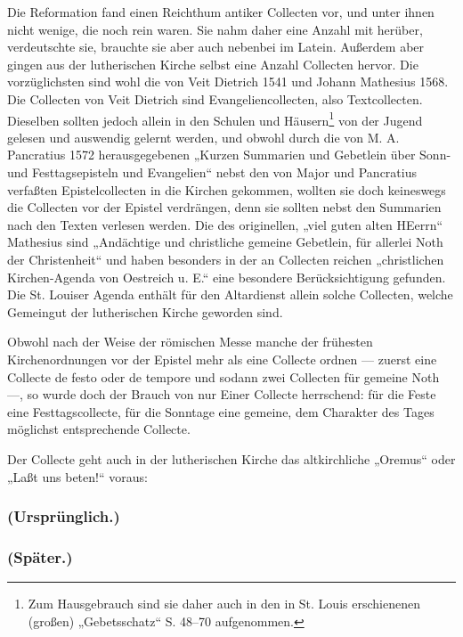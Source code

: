 Die Reformation fand einen Reichthum antiker Collecten vor, und unter ihnen nicht wenige, die noch rein waren. Sie nahm daher eine Anzahl mit herüber, verdeutschte sie, brauchte sie aber auch nebenbei im Latein. Außerdem aber gingen aus der lutherischen Kirche selbst eine Anzahl Collecten hervor. Die vorzüglichsten sind wohl die von Veit Dietrich 1541 und Johann Mathesius 1568. Die Collecten von Veit Dietrich sind Evangeliencollecten, also Textcollecten. Dieselben sollten jedoch allein in den Schulen und Häusern\footnote{Zum Hausgebrauch sind sie daher auch in den in St. Louis erschienenen (großen) „Gebetsschatz“ S. 48–70 aufgenommen.} von der Jugend gelesen und auswendig gelernt werden, und obwohl durch die von M. A. Pancratius 1572 herausgegebenen „Kurzen Summarien und Gebetlein über Sonn- und Festtagsepisteln und Evangelien“ nebst den von Major und Pancratius verfaßten Epistelcollecten in die Kirchen gekommen, wollten sie doch keineswegs die Collecten vor der Epistel verdrängen, denn sie sollten nebst den Summarien nach den Texten verlesen werden. Die des originellen, „viel guten alten HEerrn“ Mathesius sind „Andächtige und christliche gemeine Gebetlein, für allerlei Noth der Christenheit“ und haben besonders in der an Collecten reichen „christlichen Kirchen-Agenda von Oestreich u. E.“ eine besondere Berücksichtigung gefunden. Die St. Louiser Agenda enthält für den Altardienst allein solche Collecten, welche Gemeingut der lutherischen Kirche geworden sind.

Obwohl nach der Weise der römischen Messe manche der frühesten Kirchenordnungen vor der Epistel mehr als eine Collecte ordnen — zuerst eine Collecte de festo oder de tempore und sodann zwei Collecten für gemeine Noth —, so wurde doch der Brauch von nur Einer Collecte herrschend: für die Feste eine Festtagscollecte, für die Sonntage eine gemeine, dem Charakter des Tages möglichst entsprechende Collecte.

Der Collecte geht auch in der lutherischen Kirche das altkirchliche „Oremus“ oder „Laßt uns beten!“ voraus:

\subsubsection{(Ursprünglich.)}


\subsubsection{(Später.)}

